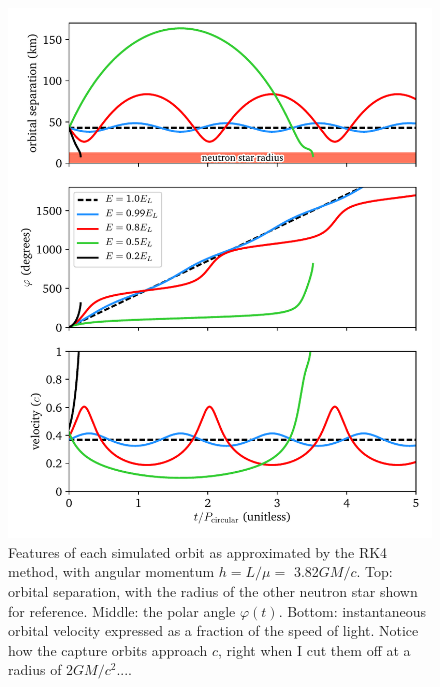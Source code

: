 \documentclass[11pt]{article}
\begin{document}
\begin{enumerate}
\begin{figure}
\centering
\includegraphics{relativistic_orbit/relativistic_orbit_parameters.pdf}
\caption{\label{fig:orbit_properties} Features of each simulated orbit as approximated by the RK4 method, with angular momentum $h = L/\mu =$ 3.82$GM/c$. Top: orbital separation, with the radius of the other neutron star shown for reference. Middle: the polar angle $\varphi(t)$. Bottom: instantaneous orbital velocity expressed as a fraction of the speed of light. Notice how the capture orbits approach $c$, right when I cut them off at a radius of $2GM/c^2$....}
\end{figure}
\begin{figure}
\centering

\end{figure}
\end{enumerate}
\end{document}
